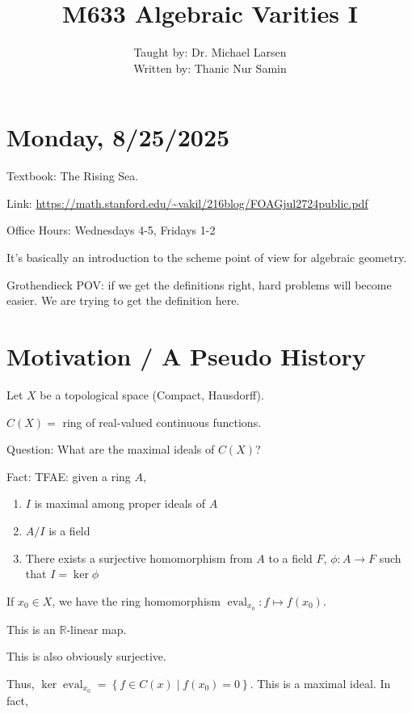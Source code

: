\documentclass{article}
\title{M633 Algebraic Varities I}
\author{Taught by: Dr. Michael Larsen \\ Written by: Thanic Nur Samin}
\date{}
\theoremstyle{definition}
\begin{document}
    \maketitle

    \section*{Monday, 8/25/2025}
    
    Textbook: The Rising Sea.
    
    Link: \url{https://math.stanford.edu/~vakil/216blog/FOAGjul2724public.pdf}

    Office Hours: Wednesdays 4-5, Fridays 1-2

    It's basically an introduction to the scheme point of view for algebraic geometry.

    Grothendieck POV: if we get the definitions right, hard problems will become easier. We are trying to get the definition here.

    \section*{Motivation / A Pseudo History}

    Let \(X\) be a topological space (Compact, Hausdorff).

    \(C(X)=\) ring of real-valued continuous functions.

    Question: What are the maximal ideals of \(C(X)\)?

    Fact: TFAE: given a ring \(A\),

    \begin{enumerate}[label=\roman*)]
        \item \(I\) is maximal among proper ideals of \(A\)
        \item \(A / I\) is a field
        \item There exists a surjective homomorphism from \(A\) to a field \(F\), \(\phi : A \to F\) such that \(I = \ker \phi\)  
    \end{enumerate} 

    If \(x_0\in X\), we have the ring homomorphism \(\operatorname{eval}_{x_0}: f \mapsto f(x_0)\).

    This is an \(\mathbb{R}\)-linear map.

    This is also obviously surjective.

    Thus, \(\ker \operatorname{eval}_{x_0} = \left\{ f\in C(x) \mid f(x_0) = 0 \right\}\). This is a maximal ideal. In fact,
\end{document}
